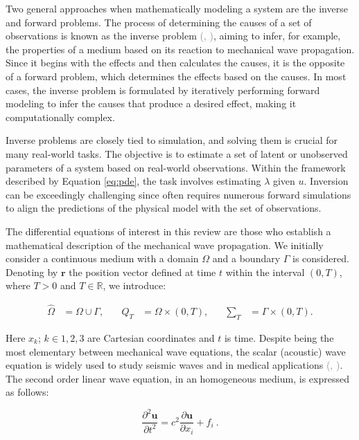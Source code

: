 \documentclass{tufte-handout}
\renewcommand{\citep}[2][]{\textcolor{gray}{(\citeauthor{#2}, \citeyear[#1]{#2})}}
\begin{document}
Two general approaches when mathematically modeling a system are the inverse and forward problems. The process of determining the causes of a set of observations is known as the inverse problem \citep{Tarantola}, aiming to infer, for example, the properties of a medium based on its reaction to mechanical wave propagation. Since it begins with the effects and then calculates the causes, it is the opposite of a forward problem, which determines the effects based on the causes. In most cases, the inverse problem is formulated by iteratively performing forward modeling to infer the causes that produce a desired effect, making it computationally complex.


Inverse problems are closely tied to simulation, and solving them is crucial for many real-world tasks. The objective is to estimate a set of latent or unobserved parameters of a system based on real-world observations. Within the framework described by Equation \ref{eq:pde}, the task involves estimating $\lambda$ given $u$. Inversion can be exceedingly challenging since often requires numerous forward simulations to align the predictions of the physical model with the set of observations. 

The differential equations of interest in this review are those who establish a mathematical description of the mechanical wave propagation. We initially consider a continuous medium with a domain $\Omega$ and a boundary $\Gamma$ is considered. Denoting by $\mathbf{r}$ the position vector defined at time $ t $ within the interval $(0, T)$, where $ T > 0 $ and $ T \in \mathbb{R} $, we introduce: 

$$
\begin{aligned}
\hat{\Omega} &= \Omega \cup \Gamma, &\quad
Q_T &= \Omega \times (0,T), &\quad
\sum_T &= \Gamma \times (0,T).
\end{aligned}
$$

Here $x_k$; $k  \in {1, 2, 3}$ are Cartesian coordinates and $t$ is time. Despite being the most elementary between mechanical wave equations, the scalar (acoustic) wave equation is widely used to study seismic waves and in medical applications \citep{alkhadhr_wave_2023}. The second order linear wave equation, in an homogeneous medium, is expressed as follows:

\begin{equation}
\frac{\partial^2 \boldsymbol{u}}{\partial t^2} =  c^{2} \frac{\partial \boldsymbol{u}}{\partial x_i} + f_i  \ .
\label{acustic}
\end{equation}
\end{document}
